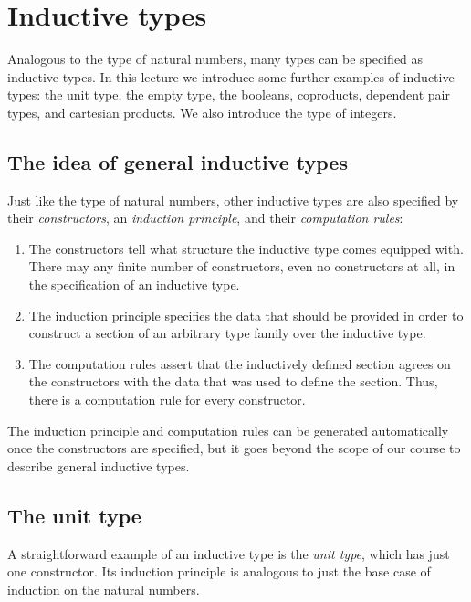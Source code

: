 \section{Inductive types}

Analogous to the type of natural numbers, many types can be specified as inductive types. In this lecture we introduce some further examples of inductive types: the unit type, the empty type, the booleans, coproducts, dependent pair types, and cartesian products. We also introduce the type of integers.

\subsection{The idea of general inductive types}

Just like the type of natural numbers, other inductive types are also specified by their \emph{constructors}, an \emph{induction principle}, and their \emph{computation rules}: 
\begin{enumerate}
\item The constructors tell what structure the inductive type comes equipped with. There may any finite number of constructors, even no constructors at all, in the specification of an inductive type. 
\item The induction principle specifies the data that should be provided in order to construct a section of an arbitrary type family over the inductive type. 
\item The computation rules assert that the inductively defined section agrees on the constructors with the data that was used to define the section. Thus, there is a computation rule for every constructor.
\end{enumerate}
The induction principle and computation rules can be generated automatically once the constructors are specified, but it goes beyond the scope of our course to describe general inductive types.


\subsection{The unit type}
A straightforward example of an inductive type is the \emph{unit type}, which has just one constructor. 
Its induction principle is analogous to just the base case of induction on the natural numbers.

